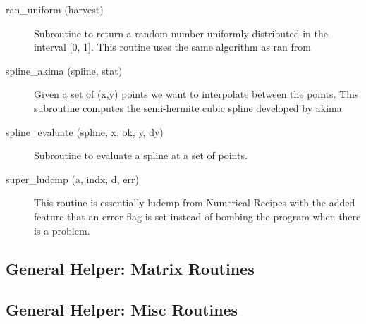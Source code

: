\begin{description}
\label{r:ran.uniform}
\item[ran_uniform (harvest)] \Newline 
Subroutine to return a random number uniformly distributed in the 
interval [0, 1]. This routine uses the same algorithm as ran from

\label{r:spline.akima}
\item[spline_akima (spline, stat)] \Newline 
Given a set of (x,y) points we want to interpolate between the points.
This subroutine computes the semi-hermite cubic spline developed by akima

\label{r:spline.evaluate}
\item[spline_evaluate (spline, x, ok, y, dy)] \Newline 
Subroutine to evaluate a spline at a set of points.

\label{r:super.ludcmp}
\item[super_ludcmp (a, indx, d, err)] \Newline 
This routine is essentially ludcmp from Numerical Recipes with the added feature
that an error flag is set instead of bombing the program when there is a problem.

\end{description}

\subsection{General Helper: Matrix Routines}

\begin{description}

\end{description}

\subsection{General Helper: Misc Routines}

